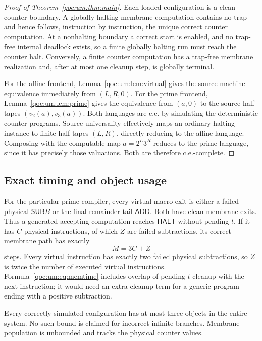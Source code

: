 \documentclass[11pt,letterpaper]{article}
\theoremstyle{definition}
\theoremstyle{remark}
\newcommand{\HALT}{\mathsf{HALT}}
\newcommand{\ADD}{\mathsf{ADD}}
\newcommand{\SUB}{\mathsf{SUB}}
\begin{document}
\begin{proof}[Proof of Theorem~\ref{qoc:um:thm:main}]
Each loaded configuration is a clean counter boundary. A globally halting membrane computation contains no trap and hence follows, instruction by instruction, the unique correct counter computation. At a nonhalting boundary a correct start is enabled, and no trap-free internal deadlock exists, so a finite globally halting run must reach the counter halt. Conversely, a finite counter computation has a trap-free membrane realization and, after at most one cleanup step, is globally terminal.

For the affine frontend, Lemma~\ref{qoc:um:lem:virtual} gives the source-machine equivalence immediately from $(L,R,0)$. For the prime frontend, Lemma~\ref{qoc:um:lem:prime} gives the equivalence from $(a,0)$ to the source half tapes $(v_2(a),v_3(a))$. Both languages are c.e. by simulating the deterministic counter programs. Source universality effectively maps an ordinary halting instance to finite half tapes $(L,R)$, directly reducing to the affine language. Composing with the computable map $a=2^L3^R$ reduces to the prime language, since it has precisely those valuations. Both are therefore c.e.-complete.
\end{proof}

\subsection{Exact timing and object usage}
For the particular prime compiler, every virtual-macro exit is either a failed physical $\SUB B$ or the final remainder-tail $\ADD$. Both have clean membrane exits. Thus a generated accepting computation reaches $\HALT$ without pending $t$. If it has $C$ physical instructions, of which $Z$ are failed subtractions, its correct membrane path has exactly
\begin{equation}\label{qoc:um:eq:memtime}
 M=3C+Z
\end{equation}
steps. Every virtual instruction has exactly two failed physical subtractions, so $Z$ is twice the number of executed virtual instructions. Formula~\eqref{qoc:um:eq:memtime} includes overlap of pending-$t$ cleanup with the next instruction; it would need an extra cleanup term for a generic program ending with a positive subtraction.

Every correctly simulated configuration has at most three objects in the entire system. No such bound is claimed for incorrect infinite branches. Membrane population is unbounded and tracks the physical counter values.
\end{document}
